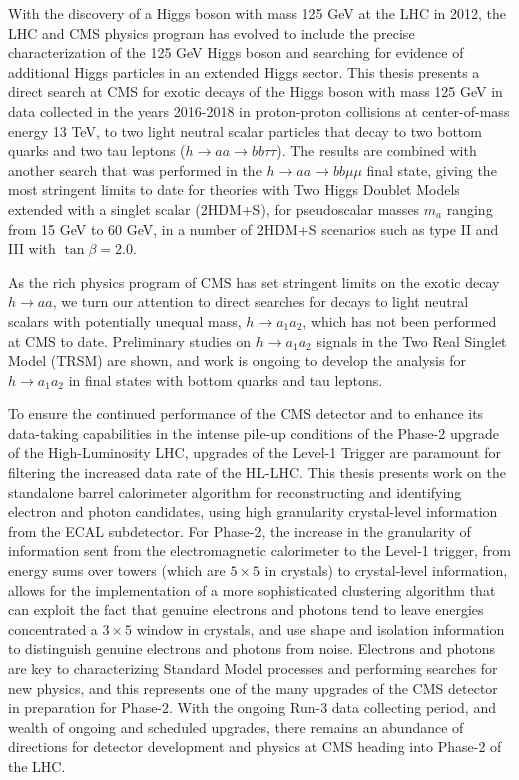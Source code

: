 With the discovery of a Higgs boson with mass 125 GeV at the LHC in 2012, the LHC and CMS physics program has evolved to include the precise characterization of the 125 GeV Higgs boson and searching for evidence of additional Higgs particles in an extended Higgs sector. This thesis presents a direct search at CMS for exotic decays of the Higgs boson with mass 125 GeV in data collected in the years 2016-2018 in proton-proton collisions at center-of-mass energy 13 TeV, to two light neutral scalar particles that decay to two bottom quarks and two tau leptons ($h \rightarrow aa \rightarrow bb\tau\tau$). The results are combined with another search that was performed in the $h \rightarrow aa \rightarrow bb\mu\mu$ final state, giving the most stringent limits to date for theories with Two Higgs Doublet Models extended with a singlet scalar (2HDM+S), for pseudoscalar masses $m_a$ ranging from 15 GeV to 60 GeV, in a number of 2HDM+S scenarios such as type II and III with $\tan\beta = 2.0$.

As the rich physics program of CMS has set stringent limits on the exotic decay $h \rightarrow aa$, we turn our attention to direct searches for decays to light neutral scalars with potentially unequal mass, $h \rightarrow a_1 a_2$, which has not been performed at CMS to date. Preliminary studies on $h \rightarrow a_1 a_2$ signals in the Two Real Singlet Model (TRSM) are shown, and work is ongoing to develop the analysis for $h \rightarrow a_1 a_2$ in final states with bottom quarks and tau leptons.

To ensure the continued performance of the CMS detector and to enhance its data-taking capabilities in the intense pile-up conditions of the Phase-2 upgrade of the High-Luminosity LHC, upgrades of the Level-1 Trigger are paramount for filtering the increased data rate of the HL-LHC. This thesis presents work on the standalone barrel calorimeter algorithm for reconstructing and identifying electron and photon candidates, using high granularity crystal-level information from the ECAL subdetector. For Phase-2, the increase in the granularity of information sent from the electromagnetic calorimeter to the Level-1 trigger, from energy sums over towers (which are $5\times 5$ in crystals) to crystal-level information, allows for the implementation of a more sophisticated clustering algorithm that can exploit the fact that genuine electrons and photons tend to leave energies concentrated a $3 \times 5$ window in crystals, and use shape and isolation information to distinguish genuine electrons and photons from noise. Electrons and photons are key to characterizing Standard Model processes and performing searches for new physics, and this represents one of the many upgrades of the CMS detector in preparation for Phase-2. With the ongoing Run-3 data collecting period, and wealth of ongoing and scheduled upgrades, there remains an abundance of directions for detector development and physics at CMS heading into Phase-2 of the LHC.